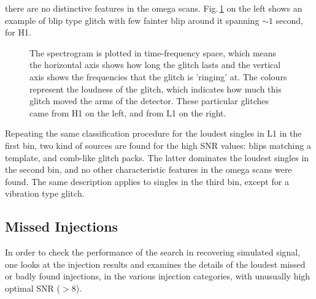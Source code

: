 \documentclass[binding=0.6cm, LaM]{sapthesis}
\begin{document}
	there are no distinctive features in the omega scans. 
	Fig.\,\ref{fig:glitch} on the left shows an example of blip type glitch with few fainter blip around it spanning $\sim1$ second, for H1.
                \begin{figure}[h]
                        \noindent
                        \label{glitch}
                        \centering
                        \caption{The spectrogram is plotted in time-frequency space, which means the horizontal axis shows how long the glitch lasts and the vertical axis shows the frequencies that the glitch is 'ringing' at. The colours represent the loudness of the glitch, which indicates how much this glitch moved the arms of the detector. These particular glitches came from H1 on the left, and  from L1 on the right.}
                        \label{fig:glitch}
                \end{figure}
	Repeating the same classification procedure for the loudest singles in L1 in the first bin,	
	two kind of sources are found for  the  high SNR values: 
	blips matching a template, and comb-like glitch packs.
	The latter dominates the loudest singles in the second bin,
	and no other characteristic features in the omega scans were found.
	The same description applies to singles in the third bin, except for a vibration type glitch.
\subsection{Missed Injections}
	In order to check the performance of the search in recovering simulated signal,
	one looks at the injection results and examines the details of the loudest 
	missed or badly found injections, in the various injection categories, 
	with unusually high optimal SNR ($>$8).
\end{document}
